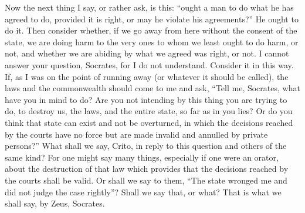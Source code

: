 \documentclass[letterpaper,12pt]{article}
\begin{document}
\begin{drama}
\socratesspeaks 
Now the next thing I say, or rather ask, is this: ``ought a man to do what he has agreed to do, provided it is right, or may he violate his agreements?''
\critospeaks 
He ought to do it.
\socratesspeaks 
Then consider whether, if we go away  from here without the consent of the state, we are doing harm to the very ones to whom we least ought to do harm, or not, and whether we are abiding by what we agreed was right, or not.
\critospeaks 
I cannot answer your question, Socrates, for I do not understand.
\socratesspeaks 
Consider it in this way. If, as I was on the point of running away (or whatever it should be called), the laws and the commonwealth should come to me and ask, ``Tell me, Socrates, what have you in mind to do? Are you not intending by this thing you are trying to do, to destroy us,  the laws, and the entire state, so far as in you lies? Or do you think that state can exist and not be overturned, in which the decisions reached by the courts have no force but are made invalid and annulled by private persons?'' What shall we say, Crito, in reply to this question and others of the same kind? For one might say many things, especially if one were an orator, about the destruction of that law which provides that the decisions reached by the courts shall be valid. Or shall we say to them,  ``The state wronged me and did not judge the case rightly''? Shall we say that, or what?
\critospeaks 
That is what we shall say, by Zeus, Socrates.
\socratesspeaks 

\end{drama}
\end{document}
